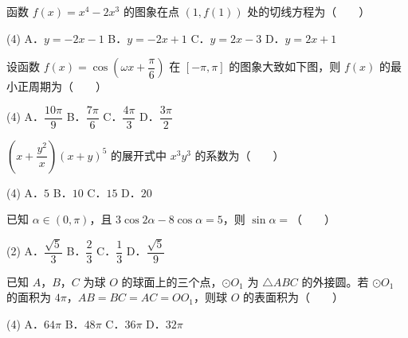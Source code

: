 \begin{question}
函数 $f(x)=x^{4}-2x^{3}$ 的图象在点 $(1,f(1))$ 处的切线方程为（　　）

\begin{gkopts}(4)
\task A．$y=-2x-1$
\task B．$y=-2x+1$
\task C．$y=2x-3$
\task D．$y=2x+1$
\end{gkopts}

\Needspace{0.4\textheight}
\end{question}
\begin{question}
设函数 $f(x)=\cos\left(\omega x+\dfrac\pi6\right)$ 在 $[-\pi,\pi]$ 的图象大致如下图，则 $f(x)$ 的最小正周期为（　　）
\nopagebreak[4]
\begin{center}\end{center}
\nopagebreak[4]
\begin{gkopts}(4)
\task A．$\dfrac{10\pi}9$
\task B．$\dfrac{7\pi}6$
\task C．$\dfrac{4\pi}3$
\task D．$\dfrac{3\pi}2$
\end{gkopts}

\end{question}
\begin{question}
$\left(x+\dfrac{y^{2}}x\right)(x+y)^{5}$ 的展开式中 $x^{3}y^{3}$ 的系数为（　　）

\begin{gkopts}(4)
\task A．$5$
\task B．$10$
\task C．$15$
\task D．$20$
\end{gkopts}

\end{question}
\begin{question}
已知 $\alpha\in(0,\pi)$，且 $3\cos2\alpha-8\cos\alpha=5$，则 $\sin\alpha=$（　　）

\begin{gkopts}(2)
\task A．$\dfrac{\sqrt5}3$
\task B．$\dfrac23$
\task C．$\dfrac13$
\task D．$\dfrac{\sqrt5}9$
\end{gkopts}

\end{question}
\begin{question}
已知 $A$，$B$，$C$ 为球 $O$ 的球面上的三个点，$\odot O_1$ 为 $\triangle ABC$ 的外接圆。若 $\odot O_1$ 的面积为 $4\pi$，$AB=BC=AC=OO_1$，则球 $O$ 的表面积为（　　）

\begin{gkopts}(4)
\task A．$64\pi$
\task B．$48\pi$
\task C．$36\pi$
\task D．$32\pi$
\end{gkopts}

\end{question}
